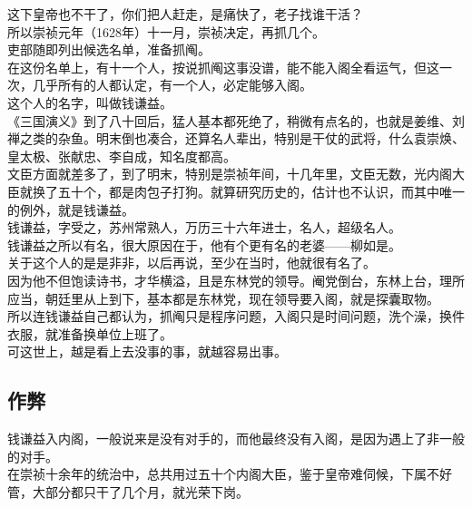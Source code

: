 \begin{multicols}{\theparacolNo}
这下皇帝也不干了，你们把人赶走，是痛快了，老子找谁干活？\\

所以崇祯元年（1628年）十一月，崇祯决定，再抓几个。\\

吏部随即列出候选名单，准备抓阄。\\

在这份名单上，有十一个人，按说抓阄这事没谱，能不能入阁全看运气，但这一次，几乎所有的人都认定，有一个人，必定能够入阁。\\

这个人的名字，叫做钱谦益。\\

《三国演义》到了八十回后，猛人基本都死绝了，稍微有点名的，也就是姜维、刘禅之类的杂鱼。明末倒也凑合，还算名人辈出，特别是干仗的武将，什么袁崇焕、皇太极、张献忠、李自成，知名度都高。\\

文臣方面就差多了，到了明末，特别是崇祯年间，十几年里，文臣无数，光内阁大臣就换了五十个，都是肉包子打狗。就算研究历史的，估计也不认识，而其中唯一的例外，就是钱谦益。\\

钱谦益，字受之，苏州常熟人，万历三十六年进士，名人，超级名人。\\

钱谦益之所以有名，很大原因在于，他有个更有名的老婆——柳如是。\\

关于这个人的是是非非，以后再说，至少在当时，他就很有名了。\\

因为他不但饱读诗书，才华横溢，且是东林党的领导。阉党倒台，东林上台，理所应当，朝廷里从上到下，基本都是东林党，现在领导要入阁，就是探囊取物。\\

所以连钱谦益自己都认为，抓阄只是程序问题，入阁只是时间问题，洗个澡，换件衣服，就准备换单位上班了。\\

可这世上，越是看上去没事的事，就越容易出事。\\

\subsection{作弊}
钱谦益入内阁，一般说来是没有对手的，而他最终没有入阁，是因为遇上了非一般的对手。\\

在崇祯十余年的统治中，总共用过五十个内阁大臣，鉴于皇帝难伺候，下属不好管，大部分都只干了几个月，就光荣下岗。\\


\end{multicols}
